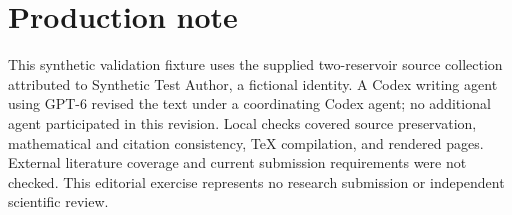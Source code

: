\section*{Production note}
This synthetic validation fixture uses the supplied two-reservoir source collection attributed to Synthetic Test Author, a fictional identity. A Codex writing agent using GPT-6 revised the text under a coordinating Codex agent; no additional agent participated in this revision. Local checks covered source preservation, mathematical and citation consistency, TeX compilation, and rendered pages. External literature coverage and current submission requirements were not checked. This editorial exercise represents no research submission or independent scientific review.

